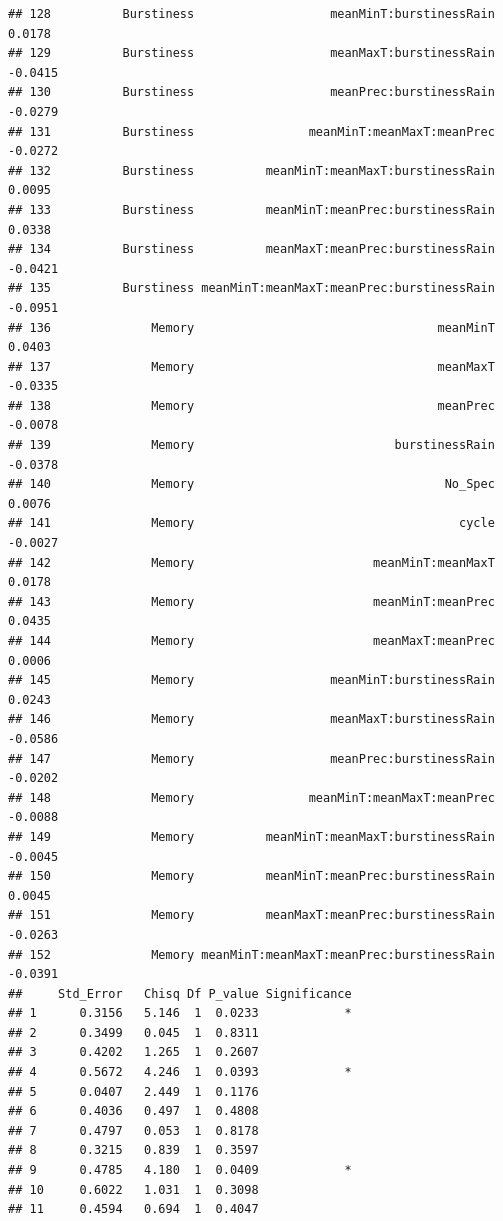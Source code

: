 \documentclass[
]{article}
\begin{document}
\begin{verbatim}
## 128          Burstiness                   meanMinT:burstinessRain      0.0178
## 129          Burstiness                   meanMaxT:burstinessRain     -0.0415
## 130          Burstiness                   meanPrec:burstinessRain     -0.0279
## 131          Burstiness                meanMinT:meanMaxT:meanPrec     -0.0272
## 132          Burstiness          meanMinT:meanMaxT:burstinessRain      0.0095
## 133          Burstiness          meanMinT:meanPrec:burstinessRain      0.0338
## 134          Burstiness          meanMaxT:meanPrec:burstinessRain     -0.0421
## 135          Burstiness meanMinT:meanMaxT:meanPrec:burstinessRain     -0.0951
## 136              Memory                                  meanMinT      0.0403
## 137              Memory                                  meanMaxT     -0.0335
## 138              Memory                                  meanPrec     -0.0078
## 139              Memory                            burstinessRain     -0.0378
## 140              Memory                                   No_Spec      0.0076
## 141              Memory                                     cycle     -0.0027
## 142              Memory                         meanMinT:meanMaxT      0.0178
## 143              Memory                         meanMinT:meanPrec      0.0435
## 144              Memory                         meanMaxT:meanPrec      0.0006
## 145              Memory                   meanMinT:burstinessRain      0.0243
## 146              Memory                   meanMaxT:burstinessRain     -0.0586
## 147              Memory                   meanPrec:burstinessRain     -0.0202
## 148              Memory                meanMinT:meanMaxT:meanPrec     -0.0088
## 149              Memory          meanMinT:meanMaxT:burstinessRain     -0.0045
## 150              Memory          meanMinT:meanPrec:burstinessRain      0.0045
## 151              Memory          meanMaxT:meanPrec:burstinessRain     -0.0263
## 152              Memory meanMinT:meanMaxT:meanPrec:burstinessRain     -0.0391
##     Std_Error   Chisq Df P_value Significance
## 1      0.3156   5.146  1  0.0233            *
## 2      0.3499   0.045  1  0.8311             
## 3      0.4202   1.265  1  0.2607             
## 4      0.5672   4.246  1  0.0393            *
## 5      0.0407   2.449  1  0.1176             
## 6      0.4036   0.497  1  0.4808             
## 7      0.4797   0.053  1  0.8178             
## 8      0.3215   0.839  1  0.3597             
## 9      0.4785   4.180  1  0.0409            *
## 10     0.6022   1.031  1  0.3098             
## 11     0.4594   0.694  1  0.4047             

\end{verbatim}
\end{document}
